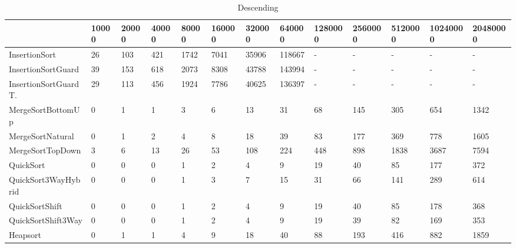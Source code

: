 \begin{table}[h]
\begin{tabular}{|l|l|l|l|l|l|l|l|l|l|l|l|l|}
\hline
 & 10000 & 20000 & 40000 & 80000 & 160000 & 320000 & 640000 & 1280000 & 2560000 & 5120000 & 10240000 & 20480000 \\ \hline
InsertionSort & 26 & 103 & 421 & 1742 & 7041 & 35906 & 118667 & - & - & - & - & - \\ \hline
InsertionSortGuard & 39 & 153 & 618 & 2073 & 8308 & 43788 & 143994 & - & - & - & - & - \\ \hline
InsertionSortGuardT. & 29 & 113 & 456 & 1924 & 7786 & 40625 & 136397 & - & - & - & - & - \\ \hline
MergeSortBottomUp & 0 & 1 & 1 & 3 & 6 & 13 & 31 & 68 & 145 & 305 & 654 & 1342 \\ \hline
MergeSortNatural & 0 & 1 & 2 & 4 & 8 & 18 & 39 & 83 & 177 & 369 & 778 & 1605 \\ \hline
MergeSortTopDown & 3 & 6 & 13 & 26 & 53 & 108 & 224 & 448 & 898 & 1838 & 3687 & 7594 \\ \hline
QuickSort & 0 & 0 & 0 & 1 & 2 & 4 & 9 & 19 & 40 & 85 & 177 & 372 \\ \hline
QuickSort3WayHybrid & 0 & 0 & 0 & 1 & 3 & 7 & 15 & 31 & 66 & 141 & 289 & 614 \\ \hline
QuickSortShift & 0 & 0 & 0 & 1 & 2 & 4 & 9 & 19 & 40 & 85 & 178 & 368 \\ \hline
QuickSortShift3Way & 0 & 0 & 0 & 1 & 2 & 4 & 9 & 19 & 39 & 82 & 169 & 353 \\ \hline
Heapsort & 0 & 1 & 1 & 4 & 9 & 18 & 40 & 88 & 193 & 416 & 882 & 1859 \\ \hline
\end{tabular}
\caption{Descending}
\end{table}

